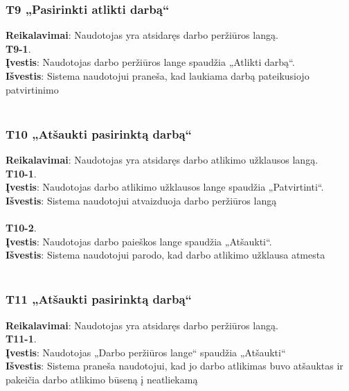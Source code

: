 \documentclass{VUMIFPSbakalaurinis}
\begin{document}
\subsubsection{T9 „Pasirinkti atlikti darbą“}
\textbf{Reikalavimai}: Naudotojas yra atsidaręs darbo peržiūros langą. \\
\textbf{T9-1}. \\
\textbf{Įvestis}: Naudotojas darbo peržiūros lange spaudžia „Atlikti darbą“. \\
\textbf{Išvestis}: Sistema naudotojui praneša, kad laukiama darbą pateikusiojo patvirtinimo \\ \\

\subsubsection{T10 „Atšaukti pasirinktą darbą“}
\textbf{Reikalavimai}: Naudotojas yra atsidaręs darbo atlikimo užklausos langą. \\
\textbf{T10-1}. \\
\textbf{Įvestis}: Naudotojas darbo atlikimo užklausos lange spaudžia „Patvirtinti“. \\
\textbf{Išvestis}: Sistema naudotojui atvaizduoja darbo peržiūros langą \\ \\
\textbf{T10-2}. \\
\textbf{Įvestis}: Naudotojas darbo paieškos lange spaudžia „Atšaukti“. \\
\textbf{Išvestis}: Sistema naudotojui parodo, kad darbo atlikimo užklausa atmesta\\ \\

\subsubsection{T11 „Atšaukti pasirinktą darbą“}
\textbf{Reikalavimai}: Naudotojas yra atsidaręs darbo peržiūros langą. \\
\textbf{T11-1}. \\
\textbf{Įvestis}: Naudotojas „Darbo peržiūros lange“ spaudžia „Atšaukti“\\
\textbf{Išvestis}: Sistema praneša naudotojui, kad jo darbo atlikimas buvo atšauktas ir pakeičia darbo atlikimo būseną į neatliekamą\\ \\
\end{document}
